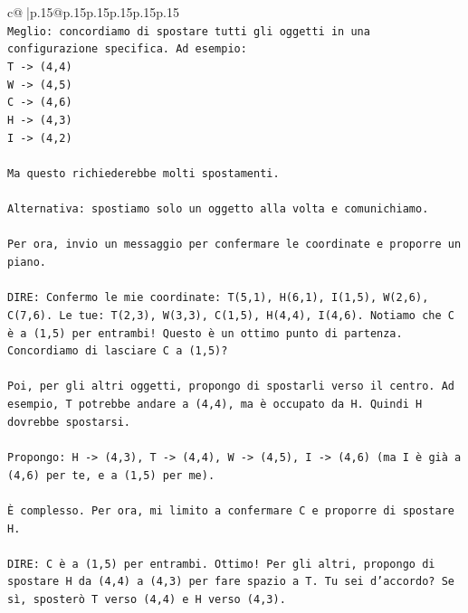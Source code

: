 \documentclass{article}
\begin{document}
{\begin{supertabular}{c@{$\;$}|p{.15\linewidth}@{}p{.15\linewidth}p{.15\linewidth}p{.15\linewidth}p{.15\linewidth}p{.15\linewidth}}
{{{\\ 
\texttt{Meglio: concordiamo di spostare tutti gli oggetti in una configurazione specifica. Ad esempio:} \\
\texttt{T {-}> (4,4)} \\
\texttt{W {-}> (4,5)} \\
\texttt{C {-}> (4,6)} \\
\texttt{H {-}> (4,3)} \\
\texttt{I {-}> (4,2)} \\
\\ 
\texttt{Ma questo richiederebbe molti spostamenti.} \\
\\ 
\texttt{Alternativa: spostiamo solo un oggetto alla volta e comunichiamo.} \\
\\ 
\texttt{Per ora, invio un messaggio per confermare le coordinate e proporre un piano.} \\
\\ 
\texttt{DIRE: Confermo le mie coordinate: T(5,1), H(6,1), I(1,5), W(2,6), C(7,6). Le tue: T(2,3), W(3,3), C(1,5), H(4,4), I(4,6). Notiamo che C è a (1,5) per entrambi! Questo è un ottimo punto di partenza. Concordiamo di lasciare C a (1,5)?} \\
\\ 
\texttt{Poi, per gli altri oggetti, propongo di spostarli verso il centro. Ad esempio, T potrebbe andare a (4,4), ma è occupato da H. Quindi H dovrebbe spostarsi.} \\
\\ 
\texttt{Propongo: H {-}> (4,3), T {-}> (4,4), W {-}> (4,5), I {-}> (4,6) (ma I è già a (4,6) per te, e a (1,5) per me).} \\
\\ 
\texttt{È complesso. Per ora, mi limito a confermare C e proporre di spostare H.} \\
\\ 
\texttt{DIRE: C è a (1,5) per entrambi. Ottimo! Per gli altri, propongo di spostare H da (4,4) a (4,3) per fare spazio a T. Tu sei d'accordo? Se sì, sposterò T verso (4,4) e H verso (4,3).} \\
            }
        }
    }
     \\ \\


\end{supertabular}}
\end{document}
